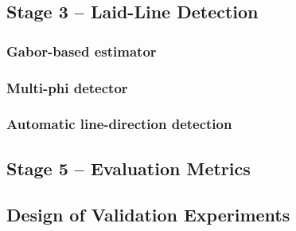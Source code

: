 \subsection{Stage 3 -- Laid-Line Detection}
\label{sec:theory:detect}

\subsubsection{Gabor-based estimator}

\subsubsection{Multi-phi detector}

\subsubsection{Automatic line-direction detection}

\subsection{Stage 5 -- Evaluation Metrics}
\label{sec:theory:metrics}
%
%

\subsection{Design of Validation Experiments}
\label{sec:theory:design}
